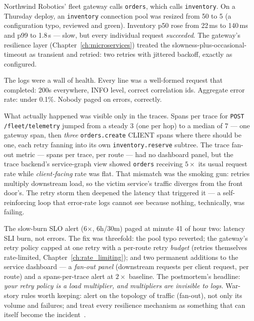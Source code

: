 Northwind Robotics' fleet gateway calls \texttt{orders}, which calls
\texttt{inventory}. On a Thursday deploy, an \texttt{inventory} connection
pool was resized from 50 to 5 (a configuration typo, reviewed and green).
Inventory p50 rose from 22\,ms to 140\,ms and p99 to 1.8\,s --- slow, but
every individual request \emph{succeeded}. The gateway's resilience layer
(Chapter~\ref{ch:microservices}) treated the slowness-plus-occasional-timeout
as transient and retried: two retries with jittered backoff, exactly as
configured.

The logs were a wall of health. Every line was a well-formed request that
completed: 200s everywhere, INFO level, correct correlation ids. Aggregate
error rate: under 0.1\%. Nobody paged on errors, correctly.

What actually happened was visible only in the traces. Spans per trace for
\texttt{POST /fleet/telemetry} jumped from a steady 3 (one per hop) to a
median of 7 --- one gateway span, then \emph{three} \texttt{orders.create}
CLIENT spans where there should be one, each retry fanning into its own
\texttt{inventory.reserve} subtree. The trace fan-out metric --- spans per
trace, per route --- had no dashboard panel, but the trace backend's
service-graph view showed \texttt{orders} receiving $5\times$ its usual
request rate while \emph{client-facing} rate was flat. That mismatch was
the smoking gun: retries multiply downstream load, so the victim service's
traffic diverges from the front door's. The retry storm then deepened the
latency that triggered it --- a self-reinforcing loop that error-rate logs
cannot see because nothing, technically, was failing.

The slow-burn SLO alert (6$\times$, 6h/30m) paged at minute 41 of hour
two: latency SLI burn, not errors. The fix was threefold: the pool typo
reverted; the gateway's retry policy capped at one retry with a per-route
retry \emph{budget} (retries themselves rate-limited,
Chapter~\ref{ch:rate_limiting}); and two permanent additions to the
service dashboard --- a \emph{fan-out panel} (downstream requests per
client request, per route) and a spans-per-trace alert at $2\times$
baseline. The postmortem's headline: \emph{your retry policy is a load
multiplier, and multipliers are invisible to logs.} War-story rules worth
keeping: alert on the topology of traffic (fan-out), not only its volume
and failures; and treat every resilience mechanism as something that can
itself become the incident~\cite{nygard2018releaseit}.

